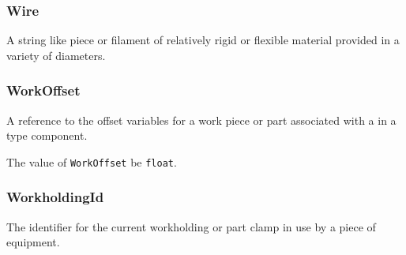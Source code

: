 \subsubsection{Wire}
\label{sec:Wire}



A string like piece or filament of relatively rigid or flexible material provided in a variety of diameters.



\subsubsection{WorkOffset}
\label{sec:WorkOffset}



A reference to the offset variables for a work piece or part associated with a  in a  type component.


The value of \texttt{WorkOffset} \MUST be \texttt{float}.



\subsubsection{WorkholdingId}
\label{sec:WorkholdingId}



The identifier for the current workholding or part clamp in use by a piece of equipment. 


